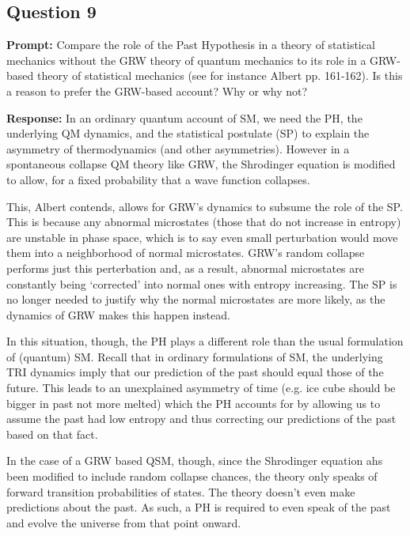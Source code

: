 \documentclass{article}
\begin{document}
\subsection*{Question 9}
\noindent\textbf{Prompt:} Compare the role of the Past Hypothesis in a theory of statistical mechanics without the GRW theory of quantum mechanics to its role in a GRW-based theory of statistical mechanics (see for instance Albert pp. 161-162). Is this a reason to prefer the GRW-based account? Why or why not?
\bigskip

\noindent\textbf{Response:} In an ordinary quantum account of SM, we need the PH, the underlying QM dynamics, and the statistical postulate (SP) to explain the asymmetry of thermodynamics (and other asymmetries). However in a spontaneous collapse QM theory like GRW, the Shrodinger equation is modified to allow, for a fixed probability that a wave function collapses.

This, Albert contends, allows for GRW's dynamics to subsume the role of the SP. This is because any abnormal microstates (those that do not increase in entropy) are unstable in phase space, which is to say even small perturbation would move them into a neighborhood of normal microstates. GRW's random collapse performs just this perterbation and, as a result, abnormal microstates are constantly being `corrected' into normal ones with entropy increasing. The SP is no longer needed to justify why the normal microstates are more likely, as the dynamics of GRW makes this happen instead.

In this situation, though, the PH plays a different role than the usual formulation of (quantum) SM. Recall that in ordinary formulations of SM, the underlying TRI dynamics imply that our prediction of the past should equal those of the future. This leads to an unexplained asymmetry of time (e.g. ice cube should be bigger in past not more melted) which the PH accounts for by allowing us to assume the past had low entropy and thus correcting our predictions of the past based on that fact.

In the case of a GRW based QSM, though, since the Shrodinger equation ahs been modified to include random collapse chances, the theory only speaks of forward transition probabilities of states. The theory doesn't even make predictions about the past. As such, a PH is required to even speak of the past and evolve the universe from that point onward.
\end{document}
